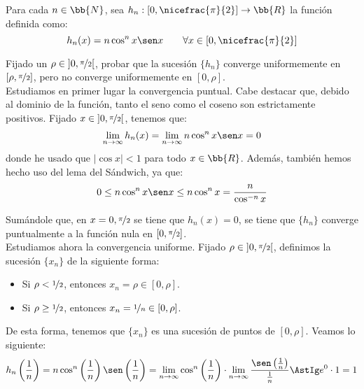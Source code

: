 \begin{ejercicio}
    Para cada $n\in \bb{N}$, sea $h_n:\left[0,\nicefrac{\pi}{2}\right]\to \bb{R}$ la función definida como:
    \begin{equation*}
        h_n(x) = n\cos^n x \sen x \qquad \forall x\in \left[0,\nicefrac{\pi}{2}\right]
    \end{equation*}

    Fijado un $\rho\in \left]0,\nicefrac{\pi}{2}\right[$, probar que la sucesión $\{h_n\}$ converge uniformemente en $[\rho,\nicefrac{\pi}{2}]$, pero no converge uniformemente en $\left[0,\rho\right]$.\\


    Estudiamos en primer lugar la convergencia puntual. Cabe destacar que, debido al 
    dominio de la función, tanto el seno como el coseno son estrictamente positivos.
    Fijado $x\in \left]0,\nicefrac{\pi}{2}\right[$, tenemos que:
    \begin{equation*}
        \lim_{n\to \infty} h_n(x) = \lim_{n\to \infty} n\cos^n x \sen x = 0
    \end{equation*}
    donde he usado que $|\cos x|<1$ para todo $x\in \bb{R}$. Además, también hemos hecho
    uso del lema del Sándwich, ya que:
    \begin{equation*}
        0 \leq n\cos^n x \sen x \leq n\cos^n x = \frac{n}{\cos^{-n} x}
    \end{equation*}   
    
    Sumándole
    que, en $x=0,\nicefrac{\pi}{2}$ se tiene que $h_n(x)=0$, se tiene que $\{h_n\}$ converge puntualmente a la función nula en $\left[0,\nicefrac{\pi}{2}\right]$.\\

    Estudiamos ahora la convergencia uniforme. Fijado $\rho\in \left]0,\nicefrac{\pi}{2}\right[$, definimos la sucesión $\{x_n\}$ de la siguiente forma:
    \begin{itemize}
        \item Si $\rho < \nicefrac{1}{2}$, entonces $x_n = \rho \in [0, \rho]$.
        \item Si $\rho \geq \nicefrac{1}{2}$, entonces $x_n = \nicefrac{1}{n}\in [0, \rho]$.
    \end{itemize}

    De esta forma, tenemos que $\{x_n\}$ es una sucesión de puntos de $[0,\rho]$. Veamos lo siguiente:
    \begin{equation*}
        h_n\left(\frac{1}{n}\right) = n\cos^n\left(\frac{1}{n}\right)\sen\left(\frac{1}{n}\right) =
        \lim_{n\to \infty} \cos^n\left(\frac{1}{n}\right)\cdot \lim_{n\to \infty} \frac{\sen\left(\frac{1}{n}\right)}{\frac{1}{n}} \AstIg e^0\cdot 1 = 1
    \end{equation*}


\end{ejercicio}
